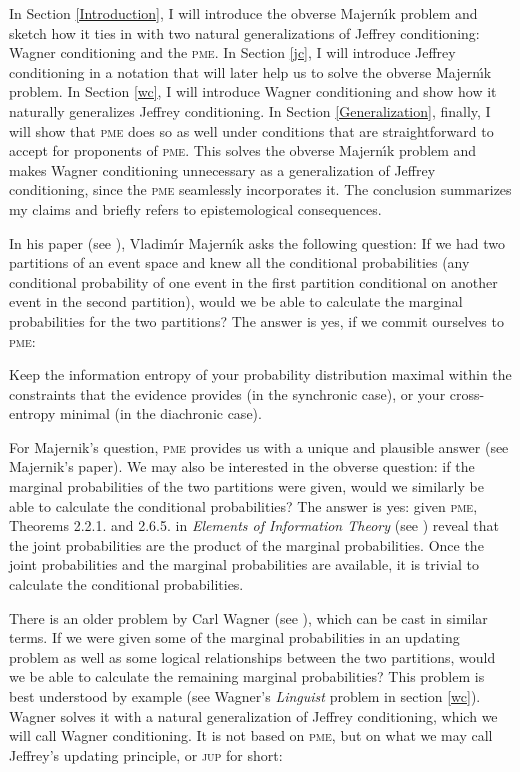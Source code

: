 \documentclass[11pt]{article}
\begin{document}
In Section \ref{Introduction}, I will introduce the obverse
Majern{\'\i}k problem and sketch how it ties in with two natural
generalizations of Jeffrey conditioning: Wagner conditioning and the
\textsc{pme}. In Section \ref{jc}, I will introduce Jeffrey
conditioning in a notation that will later help us to solve the
obverse Majern{\'\i}k problem. In Section \ref{wc}, I will introduce
Wagner conditioning and show how it naturally generalizes Jeffrey
conditioning. In Section \ref{Generalization}, finally, I will show
that \textsc{pme} does so as well under conditions that are
straightforward to accept for proponents of \textsc{pme}. This
solves the obverse Majern{\'\i}k problem and makes Wagner conditioning
unnecessary as a generalization of Jeffrey conditioning, since the
\textsc{pme} seamlessly incorporates it. The conclusion summarizes my
claims and briefly refers to epistemological consequences.

In his paper  (see ),
Vladim{\'\i}r Majern{\'\i}k asks the following question: If we had two
partitions of an event space and knew all the conditional
probabilities (any conditional probability of one event in the first
partition conditional on another event in the second partition), would
we be able to calculate the marginal probabilities for the two
partitions? The answer is yes, if we commit ourselves to
\textsc{pme}:

\begin{quotex}
   Keep the information entropy of your probability
  distribution maximal within the constraints that the evidence
  provides (in the synchronic case), or your cross-entropy minimal (in
  the diachronic case).
\end{quotex}

For Majernik's question, \textsc{pme} provides us with a unique and
plausible answer (see Majernik's paper). We may also be interested in
the obverse question: if the marginal probabilities of the two
partitions were given, would we similarly be able to calculate the
conditional probabilities? The answer is yes: given \textsc{pme},
Theorems 2.2.1. and 2.6.5. in \emph{Elements of Information Theory}
(see ) reveal that the joint probabilities
are the product of the marginal probabilities. Once the joint
probabilities and the marginal probabilities are available, it is
trivial to calculate the conditional probabilities.

There is an older problem by Carl Wagner (see ),
which can be cast in similar terms. If we were given some of the
marginal probabilities in an updating problem as well as some logical
relationships between the two partitions, would we be able to
calculate the remaining marginal probabilities? This problem is best
understood by example (see Wagner's \emph{Linguist} problem in section
\ref{wc}). Wagner solves it with a natural generalization of
Jeffrey conditioning, which we will call Wagner conditioning. It is
not based on \textsc{pme}, but on what we may call Jeffrey's
updating principle, or \textsc{jup} for short:
\end{document}
